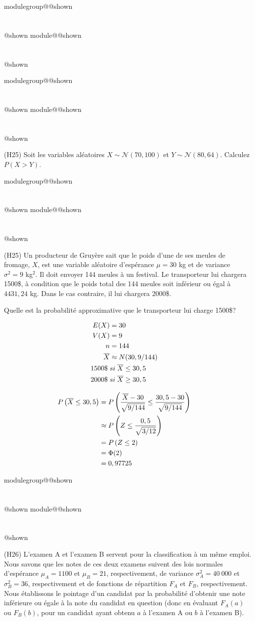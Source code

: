 \documentclass{Evaluation}
\makeatletter
\newcommand{\currentmodulekey}{}
\newcommand{\currentmoduletitle}{}
\newcommand{\currentgroupkey}{}
\newcommand{\currentgrouptitle}{}
\newcommand{\showmoduleifneeded}{%
  \ifx\currentgroupkey\empty\else
    \expandafter\ifx\csname modulegroup@\currentgroupkey @shown\endcsname\relax
      \section*{\currentgrouptitle}%
      \expandafter\gdef\csname modulegroup@\currentgroupkey @shown\endcsname{1}%
    \fi
  \fi
  \expandafter\ifx\csname module@\currentmodulekey @shown\endcsname\relax
    \section*{\currentmoduletitle}%
    \expandafter\gdef\csname module@\currentmodulekey @shown\endcsname{1}%
  \fi
}
\newenvironment{H24}{\showmoduleifneeded}{}
\newenvironment{H25}{\showmoduleifneeded}{}
\newenvironment{H26}{\showmoduleifneeded}{}
\makeatother
\begin{document}
\begin{questions}
\begin{H24}
\end{H24}

\begin{H25}
\question
(H25) Soit les variables aléatoires $X\sim\mathcal{N}(70, 100)$ et $Y\sim\mathcal{N}(80, 64)$.
Calculez $P(X>Y)$.


\end{H25}

\begin{H25}
\question
(H25)
Un producteur de Gruyère sait que le poids d'une de ses meules de fromage, $X$, est une variable aléatoire d'espérance $\mu=30$ kg et de variance $\sigma^2 = 9$ kg$^2$. 
Il doit envoyer 144 meules à un festival. 
Le transporteur lui chargera 1500\$, à condition que le poids total des 144 meules soit inférieur ou égal à $4431,24$ kg. 
Dans le cas contraire, il lui chargera 2000\$.

Quelle est la probabilité approximative que le transporteur lui charge 1500\$?

\begin{solution}
    \begin{align*}
        E(X) &= 30 \cr
        V(X) &= 9 \cr
        n&= 144 \cr
        \overline{X} &\approx N(30, 9/144) \cr
        1500 \$ \; &si \; \overline{X} \leq 30,5 \cr
        2000 \$ \; &si \; \overline{X} \geq 30,5 
    \end{align*}

    \begin{align*}
        P\left( \overline{X} \leq 30,5 \right)
        &= P\left( \frac{\overline{X}-30}{\sqrt{9/144}} \leq \frac{30,5-30}{\sqrt{9/144}}  \right) \cr
        &\approx P\left( Z \leq \frac{0,5}{\sqrt{3/12}}  \right) \cr
        &= P\left( Z \leq 2 \right) \cr
        &= \Phi(2) \cr
        &= 0,97725
    \end{align*}
\end{solution}
\end{H25}

\begin{H26}
\question
(H26)
L'examen A et l'examen B servent pour la classification à un même emploi. 
Nous savons que les notes de ces deux examens suivent des lois normales d'espérance $\mu_{A}=1100$ et $\mu_{B}=21$, respectivement, de variance $\sigma^2_{A}=40\ 000$ et $\sigma^2_{B}=36$, respectivement et de fonctions de répartition $F_A$ et $F_B$, respectivement.
Nous établissons le pointage d'un candidat par la probabilité d'obtenir une note inférieure ou égale à la note du candidat en question (donc en évaluant $F_A(a)$ ou $F_B(b)$, pour un candidat ayant obtenu $a$ à l'examen A ou $b$ à l'examen B). 


\end{H26}
\end{questions}
\end{document}
